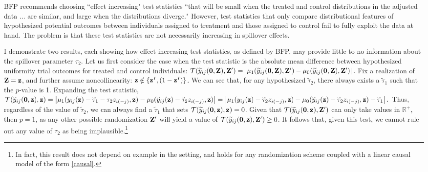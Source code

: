 BFP recommends choosing ``effect increasing" test statistics ``that will be
small when the treated and control distributions in the adjusted data ... are
similar, and large when the distributions diverge." However, test statistics
that only compare distributional features of hypothesized potential outcomes
between individuals assigned to treatment and those assigned to control fail
to fully exploit the data at hand. The problem is that these test statistics
are  not necessarily increasing in spillover effects.


I demonstrate two results, each showing how effect increasing test statistics,
as defined by BFP, may provide little to no information about the spillover
parameter $\tau_2$.  Let us first consider the case when the test statistic is
the absolute mean difference between hypothesized uniformity trial outcomes
for treated and control individuals: $\mathcal{T}(\widetilde y_{ij}(\mathbf{0},\mathbf{Z}), \mathbf{Z}') =
\left\vert \mu_1 ( \widetilde y_{ij}(\mathbf{0},\mathbf{Z}), \mathbf{Z}' ) - \mu_0 ( \widetilde
  y_{ij}(\mathbf{0},\mathbf{Z}), \mathbf{Z}' ) \right\vert.  $ Fix a realization of $\mathbf{Z} = \mathbf{z}$, and
further assume noncollinearity: $ \mathbf{z} \notin \{\mathbf{z}^I, (1-\mathbf{z}^I)\}$. We can see
that, for any hypothesized $\widetilde\tau_2$, there always exists a
$\widetilde\tau_1$ such that the $p$-value is 1. Expanding the test statistic,
$\mathcal{T}(\widetilde y_{ij}(\mathbf{0},\mathbf{z}), \mathbf{z}) = \left\vert \mu_1 (y_{ij}(\mathbf{z}) -
  \widetilde\tau_1 - \tau_2 z_{i(-j)}, \mathbf{z}) - \mu_0(\widetilde y_{ij}(\mathbf{z}) -
  \widetilde\tau_2 z_{i(-j)} , \mathbf{z}) \right\vert = \left\vert \mu_1 (y_{ij}(\mathbf{z})
  - \widetilde\tau_2 z_{i(-j)}, \mathbf{z})- \mu_0 (\widetilde y_{ij}(\mathbf{z}) -
  \widetilde\tau_2 z_{i(-j)}, \mathbf{z})- \widetilde\tau_1 \right\vert.  $ Thus,
regardless of the value of $\widetilde\tau_2$, we can always find a
$\widetilde\tau_1$ that sets $\mathcal{T}(\widetilde y_{ij}(\mathbf{0},\mathbf{z}), \mathbf{z}) = 0$. Given
that $\mathcal{T}(\widetilde y_{ij}(\mathbf{0},\mathbf{z}), \mathbf{Z}')$ can only take values in
$\mathbb{R}^+$, then $p=1$, as any other possible randomization $\mathbf{Z}'$ will
yield a value of $\mathcal{T}(\widetilde y_{ij}(\mathbf{0},\mathbf{z}), \mathbf{Z}') \geq 0$. It follows that,
given this test, we cannot rule out any value of $\tau_2$ as being
implausible.\footnote{In fact, this result does not depend on example in the
  setting, and holds for any randomization scheme coupled with a linear causal
  model of the form \eqref{causal}.}

